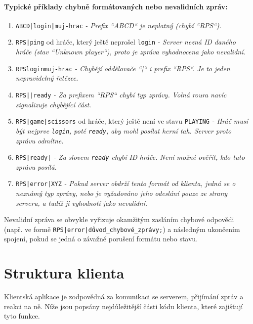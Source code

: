 \documentclass[12pt, a4paper]{article}
\begin{document}
\paragraph{Typické příklady chybně formátovaných nebo nevalidních zpráv:}
\begin{enumerate}
    \item \texttt{ABCD|login|muj-hrac}
    \textit{- Prefix ``ABCD`` je neplatný (chybí ``RPS``).}

    \item \texttt{RPS|ping} od hráče, který ještě neprošel \texttt{login}
    \textit{- Server nezná ID daného hráče (stav ``Unknown player``), proto je zpráva vyhodnocena jako nevalidní.}

    \item \texttt{RPSloginmuj-hrac}
    \textit{- Chybějí oddělovače ``|`` i prefix ``RPS``. Je to jeden nepravidelný řetězec.}

    \item \texttt{RPS||ready}
    \textit{- Za prefixem ``RPS`` chybí typ zprávy. Volná roura navíc signalizuje chybějící část.}

    \item \texttt{RPS|game|scissors} od hráče, který ještě není ve stavu \texttt{PLAYING}
    \textit{- Hráč musí být nejprve \texttt{login}, poté \texttt{ready}, aby mohl posílat herní tah. Server proto zprávu odmítne.}

    \item \texttt{RPS|ready|}
    \textit{- Za slovem \texttt{ready} chybí ID hráče. Není možné ověřit, kdo tuto zprávu posílá.}

    \item \texttt{RPS|error|XYZ}
    \textit{- Pokud server obdrží tento formát od klienta, jedná se o neznámý typ zprávy, nebo je vyžadováno jeho odeslání pouze ze strany serveru, a tudíž ji vyhodnotí jako nevalidní.}
\end{enumerate}

Nevalidní zpráva se obvykle vyřizuje okamžitým zasláním chybové odpovědi (např. ve formě \texttt{RPS|error|důvod\_chybové\_zprávy;}) a následným ukončením spojení, pokud se jedná o závažné porušení formátu nebo stavu.

\newpage

\section{Struktura klienta}

Klientská aplikace je zodpovědná za komunikaci se serverem, přijímání zpráv a reakci na ně. Níže jsou popsány nejdůležitější části kódu klienta, které zajišťují tyto funkce.
\end{document}
